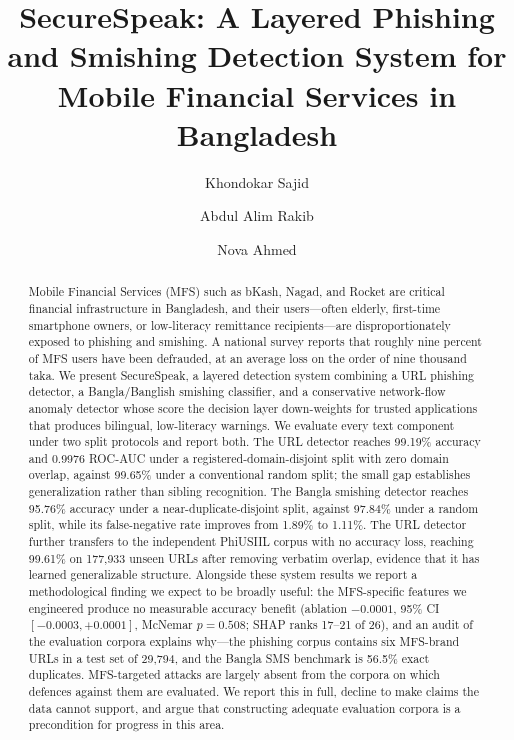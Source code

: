 \documentclass[preprint,12pt,number]{elsarticle}
\begin{document}
\begin{frontmatter}

\title{SecureSpeak: A Layered Phishing and Smishing Detection System for Mobile Financial Services in Bangladesh}

\author[nsu]{Khondokar Sajid}

\author[nsu]{Abdul Alim Rakib}

\author[nsu]{Nova Ahmed}


\begin{abstract}
Mobile Financial Services (MFS) such as bKash, Nagad, and Rocket are critical financial infrastructure in Bangladesh, and their users---often elderly, first-time smartphone owners, or low-literacy remittance recipients---are disproportionately exposed to phishing and smishing. A national survey reports that roughly nine percent of MFS users have been defrauded, at an average loss on the order of nine thousand taka. We present SecureSpeak, a layered detection system combining a URL phishing detector, a Bangla/Banglish smishing classifier, and a conservative network-flow anomaly detector whose score the decision layer down-weights for trusted applications that produces bilingual, low-literacy warnings. We evaluate every text component under two split protocols and report both. The URL detector reaches 99.19\% accuracy and 0.9976 ROC-AUC under a registered-domain-disjoint split with zero domain overlap, against 99.65\% under a conventional random split; the small gap establishes generalization rather than sibling recognition. The Bangla smishing detector reaches 95.76\% accuracy under a near-duplicate-disjoint split, against 97.84\% under a random split, while its false-negative rate improves from 1.89\% to 1.11\%. The URL detector further transfers to the independent PhiUSIIL corpus with no accuracy loss, reaching 99.61\% on 177{,}933 unseen URLs after removing verbatim overlap, evidence that it has learned generalizable structure. Alongside these system results we report a methodological finding we expect to be broadly useful: the MFS-specific features we engineered produce no measurable accuracy benefit (ablation $-0.0001$, 95\% CI $[-0.0003, +0.0001]$, McNemar $p=0.508$; SHAP ranks 17--21 of 26), and an audit of the evaluation corpora explains why---the phishing corpus contains six MFS-brand URLs in a test set of 29{,}794, and the Bangla SMS benchmark is 56.5\% exact duplicates. MFS-targeted attacks are largely absent from the corpora on which defences against them are evaluated. We report this in full, decline to make claims the data cannot support, and argue that constructing adequate evaluation corpora is a precondition for progress in this area.
\end{abstract}


\end{frontmatter}
\end{document}

